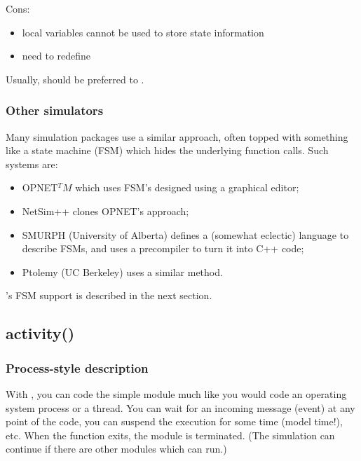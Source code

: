 Cons:
\begin{itemize}
  \item{local variables cannot be used to store state information}
  \item{need to redefine }
\end{itemize}

Usually,  should be preferred to .


\subsubsection{Other simulators}


Many simulation packages use a similar approach, often topped with
something like a state machine
(FSM) which hides the underlying function calls. Such
systems are:
\begin{itemize}
  \item{OPNET$^TM$ which uses FSM's designed using a graphical editor;}
  \item{NetSim++ clones OPNET's approach;}
  \item{SMURPH (University of Alberta) defines a (somewhat eclectic)
      language to describe FSMs, and uses a precompiler to turn it
      into C++ code;}
  \item{Ptolemy (UC Berkeley) uses a similar method.}
\end{itemize}

{\opp}'s FSM support is described in the next section.



\subsection{activity()}

\subsubsection{Process-style description}

With , you can code the simple
module much like you would code an operating system process or a
thread. You can wait for an incoming message (event) at any point of
the code, you can suspend the execution for some time (model time!),
etc. When the  function exits, the module is
terminated.  (The simulation can continue if there are other modules
which can run.)


